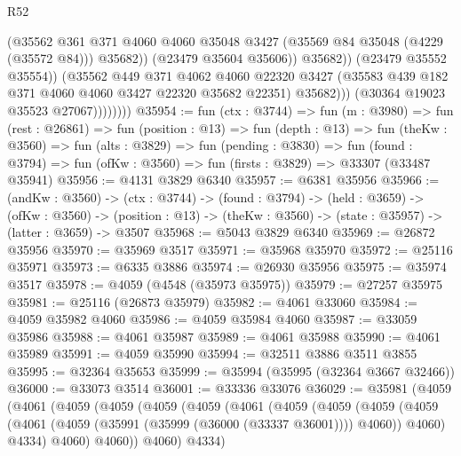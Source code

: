 \begin{lexlean}{R52}
\begin{coremodule}
                                (@35562
                                  @361
                                  @371
                                  @4060
                                  @4060
                                  @35048
                                  @3427
                                  (@35569 @84 @35048 (@4229 (@35572 @84)))
                                  @35682))
                              (@23479 @35604 @35606))
                            @35682))
                        (@23479 @35552 @35554))
                      (@35562
                        @449
                        @371
                        @4062
                        @4060
                        @22320
                        @3427
                        (@35583 @439 @182 @371 @4060 @4060 @3427 @22320 @35682 @22351)
                        @35682)))
                  (@30364 @19023 @35523 @27067))))))))
@35954 := fun (ctx : @3744) =>
  fun (m : @3980) =>
  fun (rest : @26861) =>
  fun (position : @13) =>
  fun (depth : @13) =>
  fun (theKw : @3560) =>
  fun (alts : @3829) =>
  fun (pending : @3830) =>
  fun (found : @3794) => fun (ofKw : @3560) => fun (firsts : @3829) => @33307 (@33487 @35941)
@35956 := @4131 @3829 @6340
@35957 := @6381 @35956
@35966 := (andKw : @3560) ->
  (ctx : @3744) ->
  (found : @3794) ->
  (held : @3659) ->
  (ofKw : @3560) ->
  (position : @13) -> (theKw : @3560) -> (state : @35957) -> (latter : @3659) -> @3507
@35968 := @5043 @3829 @6340
@35969 := @26872 @35956
@35970 := @35969 @3517
@35971 := @35968 @35970
@35972 := @25116 @35971
@35973 := @6335 @3886
@35974 := @26930 @35956
@35975 := @35974 @3517
@35978 := @4059 (@4548 (@35973 @35975))
@35979 := @27257 @35975
@35981 := @25116 (@26873 @35979)
@35982 := @4061 @33060
@35984 := @4059 @35982 @4060
@35986 := @4059 @35984 @4060
@35987 := @33059 @35986
@35988 := @4061 @35987
@35989 := @4061 @35988
@35990 := @4061 @35989
@35991 := @4059 @35990
@35994 := @32511 @3886 @3511 @3855
@35995 := @32364 @35653
@35999 := @35994 (@35995 (@32364 @3667 @32466))
@36000 := @33073 @3514
@36001 := @33336 @33076
@36029 := @35981
    (@4059
      (@4061
        (@4059
          (@4059
            (@4059
              (@4059
                (@4061
                  (@4059
                    (@4059
                      (@4059
                        (@4059
                          (@4061 (@4059 (@35991 (@35999 (@36000 (@33337 @36001)))) @4060))
                          @4060)
                        @4334)
                      @4060)
                    @4060))
                @4060)
              @4334)

\end{coremodule}
\end{lexlean}
